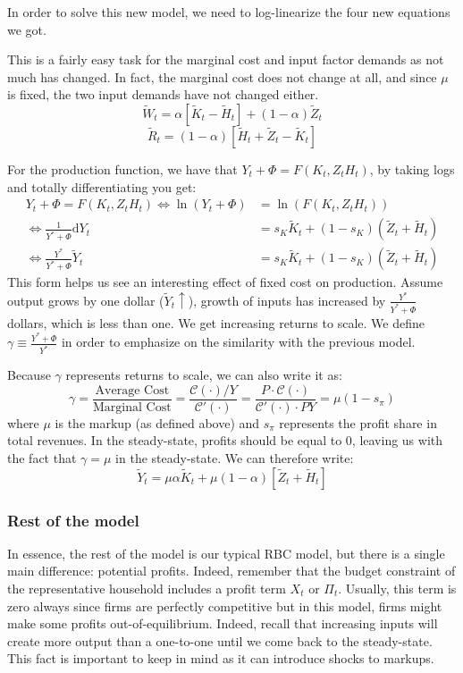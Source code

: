 \documentclass[12pt]{report}
\def\D{\mathrm{d}}
\def\D{\mathrm{d}}
\begin{document}
In order to solve this new model, we need to log-linearize the four new equations we got.

This is a fairly easy task for the marginal cost and input factor demands as not much has changed. In fact, the marginal cost does not change at all, and since $\mu$ is fixed, the two input demands have not changed either. $$ \tilde W_t = \alpha [\tilde K_t - \tilde H_t] + (1-\alpha)\tilde Z_t $$ $$ \tilde R_t = (1-\alpha)[\tilde H_t + \tilde Z_t - \tilde K_t] $$

For the production function, we have that $Y_t + \Phi	= F(K_t, Z_tH_t) $, by taking logs and totally differentiating you get:\begin{align*}
Y_t + \Phi = F(K_t, Z_tH_t) \Leftrightarrow  \ln(Y_t + \Phi) & = \ln(F(K_t, Z_tH_t)) \\
\Leftrightarrow  \frac{1}{Y^* + \Phi}\D Y_t & = s_K \tilde{K}_t + (1 - s_K)(\tilde{Z}_t + \tilde{H}_t)\\
\Leftrightarrow  \frac{Y^*}{Y^* + \Phi}\tilde Y_t & = s_K \tilde{K}_t + (1 - s_K)(\tilde{Z}_t + \tilde{H}_t)
\end{align*} This form helps us see an interesting effect of fixed cost on production. Assume output grows by one dollar ($\tilde Y_t\uparrow$), growth of inputs has increased by $\frac{Y^*}{Y^* + \Phi}$ dollars, which is less than one. We get increasing returns to scale. We define $\gamma \equiv \frac{Y^*+ \Phi}{Y^*}$ in order to emphasize on the similarity with the previous model.

Because $\gamma$ represents returns to scale, we can also write it as: $$\gamma = \frac{\text{Average Cost}}{\text{Marginal Cost}} = \frac{\mathcal{C}(\cdot)/Y}{\mathcal{C}'(\cdot)} = \frac{P\cdot\mathcal{C}(\cdot)}{\mathcal{C}'(\cdot)\cdot PY} = \mu(1 - s_\pi) $$ where $\mu$ is the markup (as defined above) and $s_\pi$ represents the profit share in total revenues. In the steady-state, profits should be equal to 0, leaving us with the fact that $\gamma = \mu$ in the steady-state. We can therefore write: $$\tilde Y_t = \mu \alpha \tilde K_t + \mu (1 - \alpha)[\tilde Z_t + \tilde H_t] $$

\subsubsection{Rest of the model}

In essence, the rest of the model is our typical RBC model, but there is a single main difference: potential profits. Indeed, remember that the budget constraint of the representative household includes a profit term $X_t$ or $\Pi_t$. Usually, this term is zero always since firms are perfectly competitive but in this model, firms might make some profits out-of-equilibrium. Indeed, recall that increasing inputs will create more output than a one-to-one until we come back to the steady-state. This fact is important to keep in mind as it can introduce shocks to markups.
\end{document}
